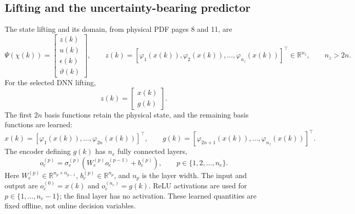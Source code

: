 \documentclass{article}
\begin{document}
\subsection*{Lifting and the uncertainty-bearing predictor}
The state lifting and its domain, from physical PDF pages 8 and 11, are
\begin{equation}
\Psi(\chi(k))=\begin{bmatrix}z(k)\\u(k)\\\epsilon(k)\\\vartheta(k)\end{bmatrix},\qquad
z(k)=[\varphi_1(x(k)),\varphi_2(x(k)),\ldots,\varphi_{n_z}(x(k))]^\top\in\mathbb{R}^{n_z},\qquad n_z>2n. \tag{19}
\end{equation}
For the selected DNN lifting,
\begin{equation}
z(k)=\begin{bmatrix}x(k)\\g(k)\end{bmatrix}. \tag{26}
\end{equation}
The first $2n$ basis functions retain the physical state, and the remaining basis functions are learned:
\[
x(k)=[\varphi_1(x(k)),\ldots,\varphi_{2n}(x(k))]^\top,\qquad
g(k)=[\varphi_{2n+1}(x(k)),\ldots,\varphi_{n_z}(x(k))]^\top.
\]
The encoder defining $g(k)$ has $n_e$ fully connected layers,
\begin{equation}
o_e^{(p)}=\sigma_e^{(p)}\left(W_e^{(p)}o_e^{(p-1)}+b_e^{(p)}\right),\qquad p\in\{1,2,\ldots,n_e\}. \tag{27}
\end{equation}
Here $W_e^{(p)}\in\mathbb{R}^{n_p\times n_{p-1}}$, $b_e^{(p)}\in\mathbb{R}^{n_p}$, and $n_p$ is the layer width. The input and output are $o_e^{(0)}=x(k)$ and $o_e^{(n_e)}=g(k)$. ReLU activations are used for $p\in\{1,\ldots,n_e-1\}$; the final layer has no activation. These learned quantities are fixed offline, not online decision variables.
\end{document}
